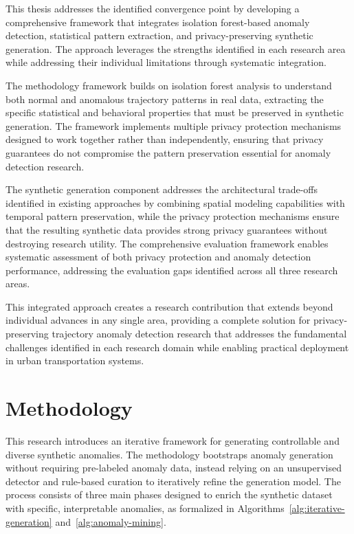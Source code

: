 \documentclass[runningheads]{llncs}
\begin{document}
This thesis addresses the identified convergence point by developing a comprehensive framework that integrates isolation forest-based anomaly detection, statistical pattern extraction, and privacy-preserving synthetic generation. The approach leverages the strengths identified in each research area while addressing their individual limitations through systematic integration.

The methodology framework builds on isolation forest analysis to understand both normal and anomalous trajectory patterns in real data, extracting the specific statistical and behavioral properties that must be preserved in synthetic generation. The framework implements multiple privacy protection mechanisms designed to work together rather than independently, ensuring that privacy guarantees do not compromise the pattern preservation essential for anomaly detection research.

The synthetic generation component addresses the architectural trade-offs identified in existing approaches by combining spatial modeling capabilities with temporal pattern preservation, while the privacy protection mechanisms ensure that the resulting synthetic data provides strong privacy guarantees without destroying research utility. The comprehensive evaluation framework enables systematic assessment of both privacy protection and anomaly detection performance, addressing the evaluation gaps identified across all three research areas.

This integrated approach creates a research contribution that extends beyond individual advances in any single area, providing a complete solution for privacy-preserving trajectory anomaly detection research that addresses the fundamental challenges identified in each research domain while enabling practical deployment in urban transportation systems.

\section{Methodology}
\label{sec:methodology}

This research introduces an iterative framework for generating controllable and diverse synthetic anomalies. The methodology bootstraps anomaly generation without requiring pre-labeled anomaly data, instead relying on an unsupervised detector and rule-based curation to iteratively refine the generation model. The process consists of three main phases designed to enrich the synthetic dataset with specific, interpretable anomalies, as formalized in Algorithms~\ref{alg:iterative-generation} and~\ref{alg:anomaly-mining}.
\end{document}
